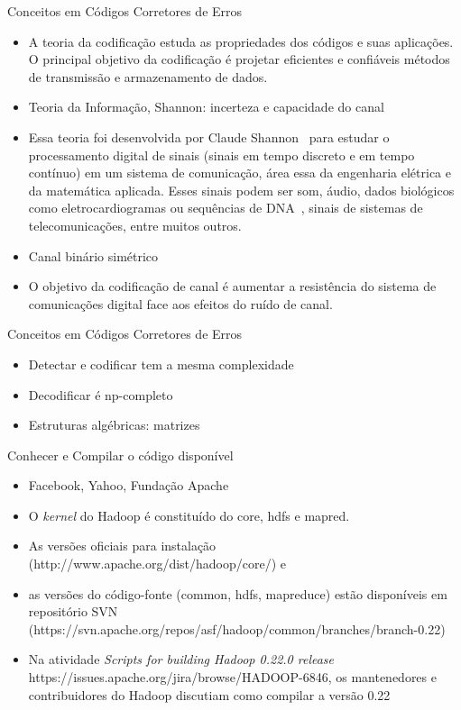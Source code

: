   \begin{frame}{Conceitos em Códigos Corretores de Erros}
     \begin{itemize}
        \item<1-> A teoria da codificação estuda as propriedades dos códigos e suas aplicações. O principal objetivo da codificação é projetar eficientes e confiáveis métodos de transmissão e armazenamento de dados.
        \item<2-> Teoria da Informação, Shannon: incerteza e capacidade do canal
        \item<3-> Essa teoria foi desenvolvida por Claude Shannon~\cite{Shannon:1948} para estudar o processamento digital de sinais (sinais em tempo discreto e em tempo contínuo) em um sistema de comunicação, área essa da engenharia elétrica e da matemática aplicada. Esses  sinais podem ser som, áudio, dados biológicos como eletrocardiogramas ou sequências de DNA~\cite{Faria:2010,Faria:2012}, sinais de sistemas de telecomunicações, entre muitos outros.
        \item<4-> Canal binário simétrico
        \item<5-> O objetivo da codificação de canal é aumentar a resistência do sistema de comunicações digital face aos efeitos do ruído de canal.
     \end{itemize}
  \end{frame}

  \begin{frame}{Conceitos em Códigos Corretores de Erros}
     \begin{itemize}
        \item<1-> Detectar e codificar tem a mesma complexidade 
        \item<2-> Decodificar é np-completo
        \item<3-> Estruturas algébricas: matrizes
     \end{itemize}
  \end{frame}

  \begin{frame}{Conhecer e Compilar o código disponível}
     \begin{itemize}
        \item<1-> Facebook, Yahoo, Fundação Apache
        \item<2-> O \emph{kernel} do Hadoop é constituído do core, hdfs e mapred.
        \item<3-> As versões oficiais para instalação (http://www.apache.org/dist/hadoop/core/) e
        \item<4-> as versões do código-fonte (common, hdfs, mapreduce) estão disponíveis em repositório SVN (https://svn.apache.org/repos/asf/hadoop/common/branches/branch-0.22) 
        \item<5-> Na atividade \emph{Scripts for building Hadoop 0.22.0 release}  https://issues.apache.org/jira/browse/HADOOP-6846, os mantenedores e contribuidores do Hadoop discutiam como compilar a versão 0.22
     \end{itemize}
  \end{frame}

